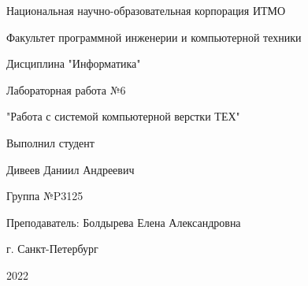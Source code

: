 \documentclass{article}
\begin{document}
\thispagestyle{empty} 
\begin{center}
    \Large
    Национальная научно-образовательная корпорация ИТМО

    Факультет программной инженерии и компьютерной техники 

    \vspace{150px}

    Дисциплина "Информатика" 

    Лабораторная работа №6

    "Работа с системой компьютерной верстки ТЕХ"

    \vspace{85px}
\end{center}

\large
\hspace*{\fill} Выполнил студент

\hspace*{\fill} Дивеев Даниил Андреевич

\hspace*{\fill} Группа №P3125

\hspace*{\fill} Преподаватель: Болдырева Елена Александровна

\vspace{100px}

\large
\begin{center}
    г. Санкт-Петербург

    2022
\end{center}
\end{document}
